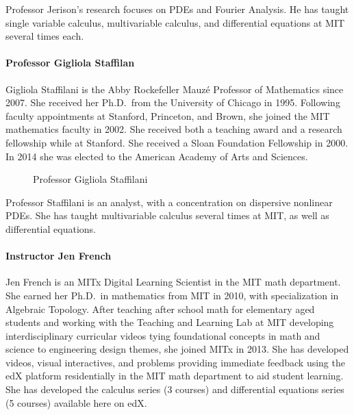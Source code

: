 \documentclass[pdftex, brazil, 12pt, twoside]{article}
\begin{document}
Professor Jerison's research focuses on PDEs and Fourier Analysis. He has taught single variable calculus, multivariable calculus, and differential equations at MIT several times each.

\paragraph{Professor Gigliola Staffilan}
Gigliola Staffilani is the Abby Rockefeller Mauzé Professor of Mathematics since 2007. She received her Ph.D.\ from the University of Chicago in 1995. Following faculty appointments at Stanford, Princeton, and Brown, she joined the MIT mathematics faculty in 2002. She received both a teaching award and a research fellowship while at Stanford. She received a Sloan Foundation Fellowship in 2000. In 2014 she was elected to the American Academy of Arts and Sciences.

\begin{figure}[H]
  \begin{center}
    \caption{Professor Gigliola Staffilani}
    \label{fig:gigliola}
  \end{center}
\end{figure}

Professor Staffilani is an analyst, with a concentration on dispersive nonlinear PDEs. She has taught multivariable calculus several times at MIT, as well as differential equations.

\paragraph{Instructor Jen French}
Jen French is an MITx Digital Learning Scientist in the MIT math department. She earned her Ph.D.\ in mathematics from MIT in 2010, with specialization in Algebraic Topology. After teaching after school math for elementary aged students and working with the Teaching and Learning Lab at MIT developing interdisciplinary curricular videos tying foundational concepts in math and science to engineering design themes, she joined MITx in 2013. She has developed videos, visual interactives, and problems providing immediate feedback using the edX platform residentially in the MIT math department to aid student learning. She has developed the calculus series (3 courses) and differential equations series (5 courses) available here on edX.
\end{document}

